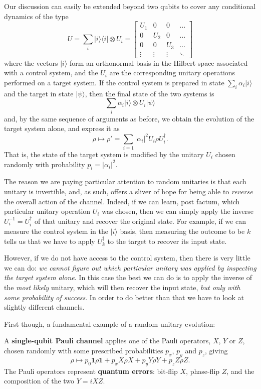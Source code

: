 \documentclass[fleqn]{article}
\newenvironment{idea}{\noindent}{\medskip}
\begin{document}
Our discussion can easily be extended beyond two qubits to cover any conditional dynamics of the type
\[
  U
  = \sum_i |i\rangle\langle i|\otimes U_i
  = \begin{bmatrix}
    U_1 & 0 & 0 & \ldots
  \\0 & U_2 & 0 & \ldots
  \\0 & 0 & U_3 & \ldots
  \\\vdots & \vdots &\vdots & \ddots
  \end{bmatrix}
\]
where the vectors \(|i\rangle\) form an orthonormal basis in the Hilbert space associated with a control system, and the \(U_i\) are the corresponding unitary operations performed on a target system.
If the control system is prepared in state \(\sum_i\alpha_i|i\rangle\) and the target in state \(|\psi\rangle\), then the final state of the two systems is
\[
  \sum_i \alpha_i|i\rangle\otimes U_i|\psi\rangle
\]
and, by the same sequence of arguments as before, we obtain the evolution of the target system alone, and express it as
\[
  \rho\longmapsto
  \rho' = \sum_{i=1} |\alpha_i|^2 U_i \rho U^\dagger_i.
\]
That is, the state of the target system is modified by the unitary \(U_i\) chosen randomly with probability \(p_i=|\alpha_i|^2\).

The reason we are paying particular attention to random unitaries is that each unitary is invertible, and, as such, offers a sliver of hope for being able to \emph{reverse} the overall action of the channel.
Indeed, if we can learn, post factum, which particular unitary operation \(U_i\) was chosen, then we can simply apply the inverse \(U_i^{-1}=U_i^\dagger\) of that unitary and recover the original state.
For example, if we can measure the control system in the \(|i\rangle\) basis, then measuring the outcome to be \(k\) tells us that we have to apply \(U_k^\dagger\) to the target to recover its input state.

However, if we do not have access to the control system, then there is very little we can do: \emph{we cannot figure out which particular unitary was applied by inspecting the target system alone}.
In this case the best we can do is to apply the inverse of the \emph{most likely} unitary, which will then recover the input state, \emph{but only with some probability of success}.
In order to do better than that we have to look at slightly different channels.

First though, a fundamental example of a random unitary evolution:

\begin{idea}
A \textbf{single-qubit Pauli channel} applies one of the Pauli operators, \(X\), \(Y\) or \(Z\), chosen randomly with some prescribed probabilities \(p_x\), \(p_y\) and \(p_z\), giving
\[
  \rho\longmapsto
  p_0 \mathbf{1}\rho\mathbf{1}+ p_x X\rho X+ p_y Y\rho Y+  p_z Z\rho Z.
\]
The Pauli operators represent \textbf{quantum errors}: bit-flip \(X\), phase-flip \(Z\), and the composition of the two \(Y=iXZ\).

\end{idea}
\end{document}
